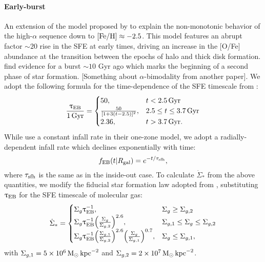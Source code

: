 \documentclass[twocolumn,twocolappendix,linenumbers,trackchanges]{aastex631}
\begin{document}
\paragraph{Early-burst} An extension of the model proposed by \citet{Conroy2022-ThickDisk} to explain the non-monotonic behavior of the high-$\alpha$ sequence down to ${\rm [Fe/H]}\approx-2.5$. This model features an abrupt factor $\sim20$ rise in the SFE at early times, driving an increase in the [O/Fe] abundance at the transition between the epochs of halo and thick disk formation. \citet{Stahlholdt2022-StarFormationEpochs} find evidence for a burst $\sim10$ Gyr ago which marks the beginning of a second phase of star formation. [Something about $\alpha$-bimodality from another paper]. We adopt the following formula for the time-dependence of the SFE timescale from \citet{Conroy2022-ThickDisk}:
\begin{equation}
    \frac{\uptau_{\rm EB}}{1\,\rm{Gyr}} =
    \begin{cases}
        50, & t < 2.5\,\rm{Gyr} \\
        \frac{50}{[1+3(t-2.5)]^2}, & 2.5\leq t \leq 3.7\,\rm{Gyr} \\
        2.36, & t > 3.7\,\rm{Gyr}.
    \end{cases}
    \label{eq:earlyburst-taustar}
\end{equation}
While \citet{Conroy2022-ThickDisk} use a constant infall rate in their one-zone model, we adopt a radially-dependent infall rate which declines exponentially with time:
\begin{equation}
    f_{\rm EB}(t|R_{\rm gal}) = e^{-t/\tau_{\rm sfh}},
    \label{eq:earlyburst-ifr}
\end{equation}
where $\tau_{\rm sfh}$ is the same as in the inside-out case.
To calculate $\dot \Sigma_*$ from the above quantities, we modify the fiducial star formation law adopted from , substituting $\uptau_{\rm EB}$ for the SFE timescale of molecular gas:
\begin{equation}
    \dot \Sigma_* = 
    \begin{cases}
        \Sigma_g \uptau_{\rm EB}^{-1}, & \Sigma_g \geq \Sigma_{g,2} \\
        \Sigma_g \uptau_{\rm EB}^{-1} \Big(\frac{\Sigma_g}{\Sigma_{g,2}}\Big)^{2.6}, & \Sigma_{g,1} \leq \Sigma_g \leq \Sigma_{g,2} \\
        \Sigma_g \uptau_{\rm EB}^{-1} \Big(\frac{\Sigma_{g,1}}{\Sigma_{g,2}}\Big)^{2.6} \Big(\frac{\Sigma_g}{\Sigma_{g,1}}\Big)^{0.7}, & \Sigma_g \leq \Sigma_{g,1},
    \end{cases}
    \label{eq:earlyburst-sfr}
\end{equation}
with $\Sigma_{g,1}=5\times 10^6\,{\rm M}_\odot\,{\rm kpc}^{-2}$ and $\Sigma_{g,2}=2\times 10^7\,{\rm M}_\odot\,{\rm kpc}^{-2}$.
\end{document}
